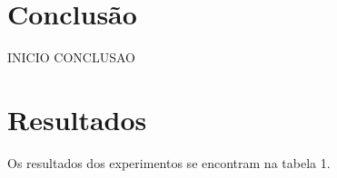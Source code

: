 \documentclass{llncs}
\begin{document}
\section{Conclusão}
  \begin{flushleft}
    INICIO CONCLUSAO

  \end{flushleft}

\newpage





%
\section{Resultados}
%
Os resultados dos experimentos se encontram na tabela 1. 
\end{document}
